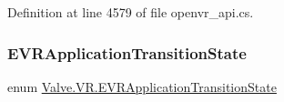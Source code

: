 Definition at line 4579 of file openvr\+\_\+api.\+cs.

\mbox{\label{namespace_valve_1_1_v_r_af00430caae64a19e9ad612ac01a208c0}} 
\subsubsection{\texorpdfstring{EVRApplicationTransitionState}{EVRApplicationTransitionState}}
{\footnotesize\ttfamily enum \mbox{\hyperlink{namespace_valve_1_1_v_r_af00430caae64a19e9ad612ac01a208c0}{Valve.\+V\+R.\+E\+V\+R\+Application\+Transition\+State}}\hspace{0.3cm}{\ttfamily [strong]}}

